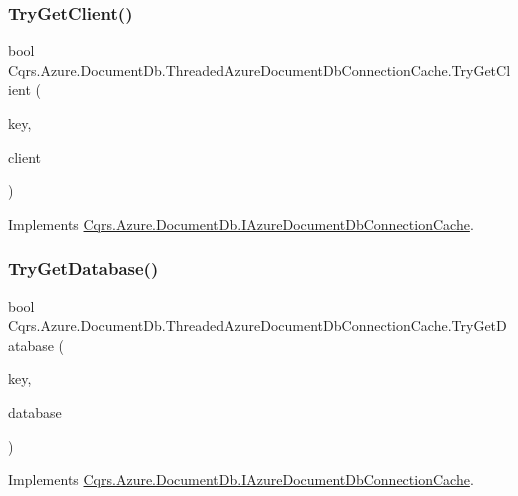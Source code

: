 \subsubsection{\texorpdfstring{Try\+Get\+Client()}{TryGetClient()}}
{\footnotesize\ttfamily bool Cqrs.\+Azure.\+Document\+Db.\+Threaded\+Azure\+Document\+Db\+Connection\+Cache.\+Try\+Get\+Client (\begin{DoxyParamCaption}\item[{string}]{key,  }\item[{out Document\+Client}]{client }\end{DoxyParamCaption})}



Implements \hyperlink{interfaceCqrs_1_1Azure_1_1DocumentDb_1_1IAzureDocumentDbConnectionCache_a56a01a4224cb64d9349913e5237cebda}{Cqrs.\+Azure.\+Document\+Db.\+I\+Azure\+Document\+Db\+Connection\+Cache}.

\mbox{\label{classCqrs_1_1Azure_1_1DocumentDb_1_1ThreadedAzureDocumentDbConnectionCache_a00ea55a85c74b84cfc5f2007e3bc9be3}} 
\subsubsection{\texorpdfstring{Try\+Get\+Database()}{TryGetDatabase()}}
{\footnotesize\ttfamily bool Cqrs.\+Azure.\+Document\+Db.\+Threaded\+Azure\+Document\+Db\+Connection\+Cache.\+Try\+Get\+Database (\begin{DoxyParamCaption}\item[{string}]{key,  }\item[{out Database}]{database }\end{DoxyParamCaption})}



Implements \hyperlink{interfaceCqrs_1_1Azure_1_1DocumentDb_1_1IAzureDocumentDbConnectionCache_ac2ab3e4a1c093f10d0b55634d4990ab2}{Cqrs.\+Azure.\+Document\+Db.\+I\+Azure\+Document\+Db\+Connection\+Cache}.

